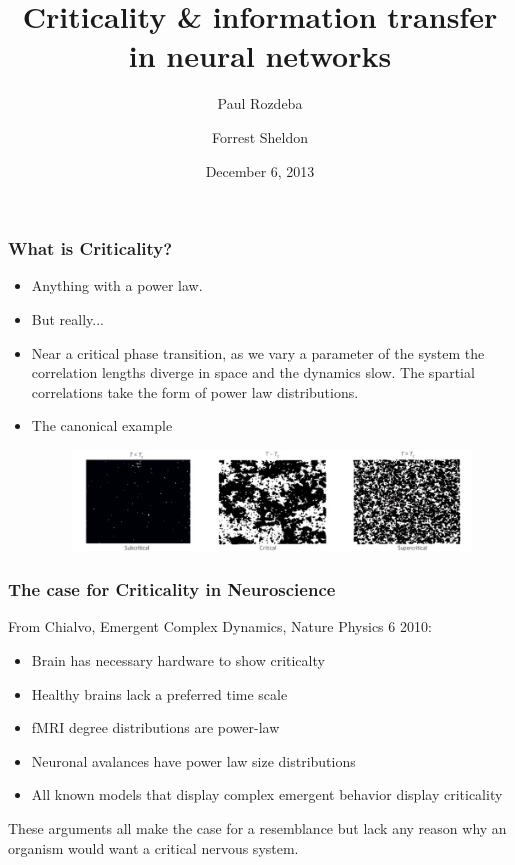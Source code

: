 \documentclass{beamer}
\title[Criticality]{Criticality \& information transfer in neural networks}
\date{December 6, 2013}
\author[P. Rozdeba \and F. Sheldon]{Paul Rozdeba\\ \and Forrest Sheldon}
\institute[UCSD]{University of California, San Diego}
\begin{document}
\begin{frame}
\titlepage
\end{frame}

\begin{frame}
\frametitle{What is Criticality?}
\begin{itemize}

\item<1> Anything with a power law.
\item<2> But really...
\item<3> Near a critical phase transition, as we vary a parameter of the system
the correlation lengths diverge in space and the dynamics slow. The spartial correlations take the form of power law distributions.
\item<3>The canonical example
\begin{figure}
	\centering
	\includegraphics[width=.9\textwidth]{Ising_critical}
\end{figure}
\end{itemize}
\end{frame}


\begin{frame}
\frametitle{The case for Criticality in Neuroscience}
From Chialvo, Emergent Complex Dynamics, Nature Physics 6 2010:
\begin{itemize}
\item Brain has necessary hardware to show criticalty
\item Healthy brains lack a preferred time scale
\item fMRI degree distributions are power-law
\item Neuronal avalances have power law size distributions
\item All known models that display complex emergent behavior display criticality
\end{itemize}
These arguments all make the case for a resemblance but lack any reason why an
organism would want a critical nervous system.
\end{frame}
\end{document}
